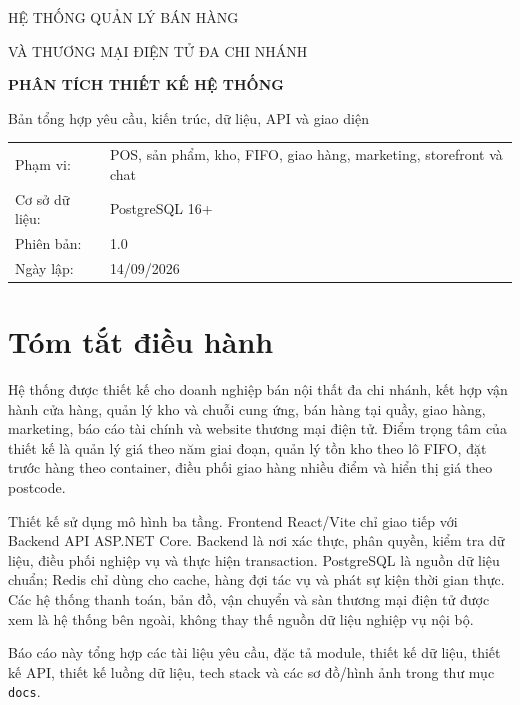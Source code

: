 \documentclass[12pt,a4paper]{report}
\begin{document}
\begin{titlepage}
  \centering
  \vspace*{1.2cm}
  {\Large HỆ THỐNG QUẢN LÝ BÁN HÀNG\par}
  \vspace{0.4cm}
  {\large VÀ THƯƠNG MẠI ĐIỆN TỬ ĐA CHI NHÁNH\par}
  \vspace{2.0cm}
  {\Huge\bfseries PHÂN TÍCH THIẾT KẾ HỆ THỐNG\par}
  \vspace{0.7cm}
  {\Large Bản tổng hợp yêu cầu, kiến trúc, dữ liệu, API và giao diện\par}
  \vfill
  \begin{tabular}{ll}
    Phạm vi: & POS, sản phẩm, kho, FIFO, giao hàng, marketing, storefront và chat\\
    Cơ sở dữ liệu: & PostgreSQL 16+\\
    Phiên bản: & 1.0\\
    Ngày lập: & 14/09/2026
  \end{tabular}
  \vfill
\end{titlepage}

\tableofcontents
\listoffigures
\listoftables
\clearpage

\chapter*{Tóm tắt điều hành}
Hệ thống được thiết kế cho doanh nghiệp bán nội thất đa chi nhánh, kết hợp vận hành cửa hàng, quản lý kho và chuỗi cung ứng, bán hàng tại quầy, giao hàng, marketing, báo cáo tài chính và website thương mại điện tử. Điểm trọng tâm của thiết kế là quản lý giá theo năm giai đoạn, quản lý tồn kho theo lô FIFO, đặt trước hàng theo container, điều phối giao hàng nhiều điểm và hiển thị giá theo postcode.

Thiết kế sử dụng mô hình ba tầng. Frontend React/Vite chỉ giao tiếp với Backend API ASP.NET Core. Backend là nơi xác thực, phân quyền, kiểm tra dữ liệu, điều phối nghiệp vụ và thực hiện transaction. PostgreSQL là nguồn dữ liệu chuẩn; Redis chỉ dùng cho cache, hàng đợi tác vụ và phát sự kiện thời gian thực. Các hệ thống thanh toán, bản đồ, vận chuyển và sàn thương mại điện tử được xem là hệ thống bên ngoài, không thay thế nguồn dữ liệu nghiệp vụ nội bộ.

Báo cáo này tổng hợp các tài liệu yêu cầu, đặc tả module, thiết kế dữ liệu, thiết kế API, thiết kế luồng dữ liệu, tech stack và các sơ đồ/hình ảnh trong thư mục \texttt{docs}.
\end{document}
